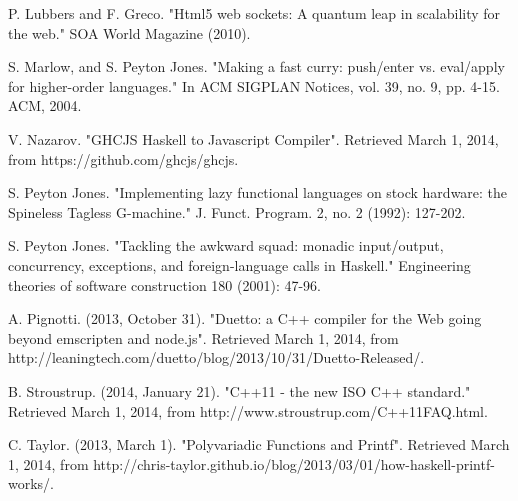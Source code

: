 \documentclass[preprint]{sigplanconf}
\begin{document}
\begin{thebibliography}{}
P. Lubbers and F. Greco. "Html5 web sockets: A quantum leap in scalability for the web." SOA World Magazine (2010).

S. Marlow, and S. Peyton Jones. "Making a fast curry: push/enter vs. eval/apply for higher-order languages." In ACM SIGPLAN Notices, vol. 39, no. 9, pp. 4-15. ACM, 2004.

V. Nazarov. "GHCJS Haskell to Javascript Compiler". Retrieved March 1, 2014, from https://github.com/ghcjs/ghcjs.

S. Peyton Jones. "Implementing lazy functional languages on stock hardware: the Spineless Tagless G-machine." J. Funct. Program. 2, no. 2 (1992): 127-202.

S. Peyton Jones. "Tackling the awkward squad: monadic input/output, concurrency, exceptions, and foreign-language calls in Haskell." Engineering theories of software construction 180 (2001): 47-96.

A. Pignotti. (2013, October 31). "Duetto: a C++ compiler for the Web going beyond emscripten and node.js". Retrieved March 1, 2014, from http://leaningtech.com/duetto/blog/2013/10/31/Duetto-Released/.

B. Stroustrup. (2014, January 21). "C++11 - the new ISO C++ standard." Retrieved March 1, 2014, from http://www.stroustrup.com/C++11FAQ.html.

C. Taylor. (2013, March 1). "Polyvariadic Functions and Printf". Retrieved March 1, 2014, from http://chris-taylor.github.io/blog/2013/03/01/how-haskell-printf-works/.

\end{thebibliography}
\end{document}
